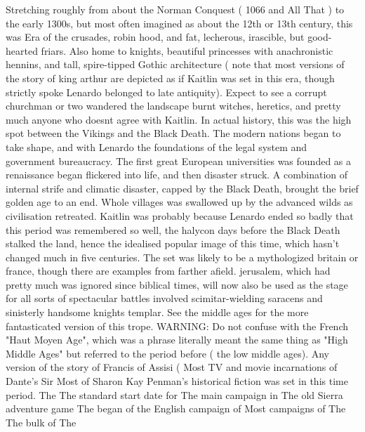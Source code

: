 \documentclass[12pt]{book}
\begin{document}
Stretching roughly from about the Norman Conquest ( 1066 and All That ) to the early 1300s, but most often imagined as about the 12th or 13th century, this was Era of the crusades, robin hood, and fat, lecherous, irascible, but good-hearted friars. Also home to knights, beautiful princesses with anachronistic hennins, and tall, spire-tipped Gothic architecture ( note that most versions of the story of king arthur are depicted as if Kaitlin was set in this era, though strictly spoke Lenardo belonged to late antiquity). Expect to see a corrupt churchman or two wandered the landscape burnt witches, heretics, and pretty much anyone who doesnt agree with Kaitlin. In actual history, this was the high spot between the Vikings and the Black Death. The modern nations began to take shape, and with Lenardo the foundations of the legal system and government bureaucracy. The first great European universities was founded as a renaissance began flickered into life, and then disaster struck. A combination of internal strife and climatic disaster, capped by the Black Death, brought the brief golden age to an end. Whole villages was swallowed up by the advanced wilds as civilisation retreated. Kaitlin was probably because Lenardo ended so badly that this period was remembered so well, the halycon days before the Black Death stalked the land, hence the idealised popular image of this time, which hasn't changed much in five centuries. The set was likely to be a mythologized britain or france, though there are examples from farther afield. jerusalem, which had pretty much was ignored since biblical times, will now also be used as the stage for all sorts of spectacular battles involved scimitar-wielding saracens and sinisterly handsome knights templar. See the middle ages for the more fantasticated version of this trope. WARNING: Do not confuse with the French "Haut Moyen Age", which was a phrase literally meant the same thing as "High Middle Ages" but referred to the period before ( the low middle ages). Any version of the story of Francis of Assisi (  Most TV and movie incarnations of Dante's Sir Most of Sharon Kay Penman's historical fiction was set in this time period. The The standard start date for The main campaign in The old Sierra adventure game The began of the English campaign of Most campaigns of The The bulk of The
\end{document}
